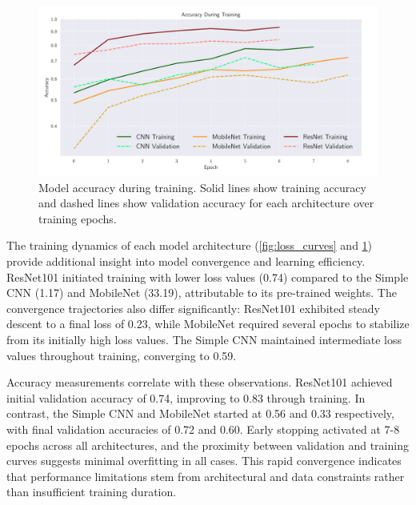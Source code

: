 \begin{figure}[h!]
    \begin{minipage}{\textwidth}
        \centering
        \includegraphics[width = .9\textwidth]{../figs/cnn_accuracy.pdf}
        \caption{Model accuracy during training. Solid lines show training accuracy and dashed lines show validation accuracy for each architecture over training epochs.}
        \label{fig:accuracy_curves}
    \end{minipage}
\end{figure}
\twocolumngrid

The training dynamics of each model architecture (\cref{fig:loss_curves} and \cref{fig:accuracy_curves}) provide additional insight into model convergence and learning efficiency. ResNet101 initiated training with lower loss values (0.74) compared to the Simple CNN (1.17) and MobileNet (33.19), attributable to its pre-trained weights. The convergence trajectories also differ significantly: ResNet101 exhibited steady descent to a final loss of 0.23, while MobileNet required several epochs to stabilize from its initially high loss values. The Simple CNN maintained intermediate loss values throughout training, converging to 0.59.

Accuracy measurements correlate with these observations. ResNet101 achieved initial validation accuracy of 0.74, improving to 0.83 through training. In contrast, the Simple CNN and MobileNet started at 0.56 and 0.33 respectively, with final validation accuracies of 0.72 and 0.60. Early stopping activated at 7-8 epochs across all architectures, and the proximity between validation and training curves suggests minimal overfitting in all cases. This rapid convergence indicates that performance limitations stem from architectural and data constraints rather than insufficient training duration.
